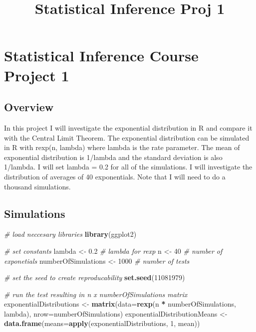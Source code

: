 \documentclass[]{article}
\title{Statistical Inference Proj 1}
\author{}
\date{}
\newenvironment{Shaded}{\begin{snugshade}}{\end{snugshade}}
\newcommand{\KeywordTok}[1]{\textcolor[rgb]{0.13,0.29,0.53}{\textbf{#1}}}
\newcommand{\DataTypeTok}[1]{\textcolor[rgb]{0.13,0.29,0.53}{#1}}
\newcommand{\DecValTok}[1]{\textcolor[rgb]{0.00,0.00,0.81}{#1}}
\newcommand{\FloatTok}[1]{\textcolor[rgb]{0.00,0.00,0.81}{#1}}
\newcommand{\StringTok}[1]{\textcolor[rgb]{0.31,0.60,0.02}{#1}}
\newcommand{\CommentTok}[1]{\textcolor[rgb]{0.56,0.35,0.01}{\textit{#1}}}
\newcommand{\OperatorTok}[1]{\textcolor[rgb]{0.81,0.36,0.00}{\textbf{#1}}}
\newcommand{\NormalTok}[1]{#1}
\begin{document}
\maketitle

\section{Statistical Inference Course Project
1}\label{statistical-inference-course-project-1}

\subsection{Overview}\label{overview}

In this project I will investigate the exponential distribution in R and
compare it with the Central Limit Theorem. The exponential distribution
can be simulated in R with rexp(n, lambda) where lambda is the rate
parameter. The mean of exponential distribution is 1/lambda and the
standard deviation is also 1/lambda. I will set lambda = 0.2 for all of
the simulations. I will investigate the distribution of averages of 40
exponentials. Note that I will need to do a thousand simulations.

\subsection{Simulations}\label{simulations}

\begin{Shaded}
\begin{Highlighting}[]
\CommentTok{# load neccesary libraries}
\KeywordTok{library}\NormalTok{(ggplot2)}

\CommentTok{# set constants}
\NormalTok{lambda <-}\StringTok{ }\FloatTok{0.2} \CommentTok{# lambda for rexp}
\NormalTok{n <-}\StringTok{ }\DecValTok{40} \CommentTok{# number of exponetials}
\NormalTok{numberOfSimulations <-}\StringTok{ }\DecValTok{1000} \CommentTok{# number of tests}

\CommentTok{# set the seed to create reproducability}
\KeywordTok{set.seed}\NormalTok{(}\DecValTok{11081979}\NormalTok{)}

\CommentTok{# run the test resulting in n x numberOfSimulations matrix}
\NormalTok{exponentialDistributions <-}\StringTok{ }\KeywordTok{matrix}\NormalTok{(}\DataTypeTok{data=}\KeywordTok{rexp}\NormalTok{(n }\OperatorTok{*}\StringTok{ }\NormalTok{numberOfSimulations, lambda), }\DataTypeTok{nrow=}\NormalTok{numberOfSimulations)}
\NormalTok{exponentialDistributionMeans <-}\StringTok{ }\KeywordTok{data.frame}\NormalTok{(}\DataTypeTok{means=}\KeywordTok{apply}\NormalTok{(exponentialDistributions, }\DecValTok{1}\NormalTok{, mean))}
\end{Highlighting}
\end{Shaded}
\end{document}
